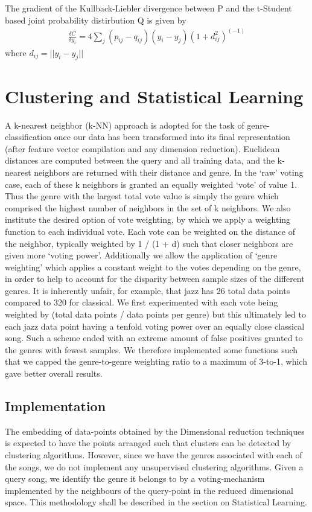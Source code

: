 \documentclass[10pt]{article}
\begin{document}
The gradient of the Kullback-Liebler divergence between P and the t-Student based joint probability distirbution Q is given by
\begin{align}
\frac{\delta C}{\delta y_i} =  4 \sum_j (p_{ij} - q_{ij})(y_i - y_j)(1 + d_{ij}^2)^(-1)\label{eq:Grad_KL_tsne}
\end{align} where $d_{ij} = ||y_i - y_j||$

\section{Clustering and Statistical Learning}

A k-nearest neighbor (k-NN) approach is adopted for the task of genre-classification once our data has been transformed into its final representation (after feature vector compilation and any dimension reduction).  Euclidean distances are computed between the query and all training data, and the k-nearest neighbors are returned with their distance and genre.  In the ‘raw’ voting case, each of these k neighbors is granted an equally weighted ‘vote’ of value 1.  Thus the genre with the largest total vote value is simply the genre which comprised the highest number of neighbors in the set of k neighbors.  We also institute the desired option of vote weighting, by which we apply a weighting function to each individual vote.  Each vote can be weighted on the distance of the neighbor, typically weighted by 1 / (1 + d) such that closer neighbors are given more ‘voting power’.  Additionally we allow the application of ‘genre weighting’ which applies a constant weight to the votes depending on the genre, in order to help to account for the disparity between sample sizes of the different genres.  It is inherently unfair, for example, that jazz has 26 total data points compared to 320 for classical.  We first experimented with each vote being weighted by (total data points / data points per genre) but this ultimately led to each jazz data point having a tenfold voting power over an equally close classical song.  Such a scheme ended with an extreme amount of false positives granted to the genres with fewest samples.  We therefore implemented some functions such that we capped the genre-to-genre weighting ratio to a maximum of 3-to-1, which gave better overall results.  


\subsection{Implementation}
The embedding of data-points obtained by the Dimensional reduction techniques is expected to have the points arranged such that clusters can be detected by clustering algorithms. However, since we have the genres associated with each of the songs, we do not implement any unsupervised clustering algorithms. Given a query song, we identify the genre it belongs to by a voting-mechanism implemented by the neighbours of the query-point in the reduced dimensional space. This methodology shall be described in the section on Statistical Learning. 
\end{document}
